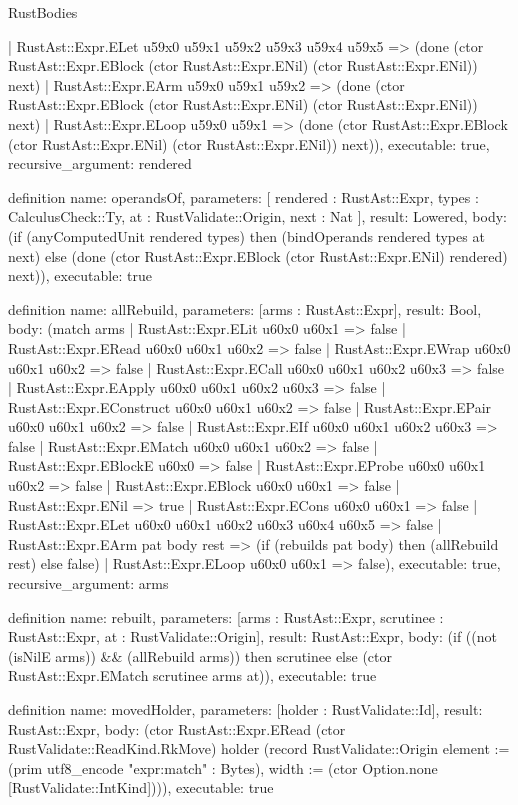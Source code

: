 \begin{lexlean}{RustBodies}
\begin{semanticmodule}
{    | RustAst::Expr.ELet u59x0 u59x1 u59x2 u59x3 u59x4 u59x5 => (done (ctor RustAst::Expr.EBlock (ctor RustAst::Expr.ENil) (ctor RustAst::Expr.ENil)) next)
    | RustAst::Expr.EArm u59x0 u59x1 u59x2 => (done (ctor RustAst::Expr.EBlock (ctor RustAst::Expr.ENil) (ctor RustAst::Expr.ENil)) next)
    | RustAst::Expr.ELoop u59x0 u59x1 => (done (ctor RustAst::Expr.EBlock (ctor RustAst::Expr.ENil) (ctor RustAst::Expr.ENil)) next)),
  executable: true,
  recursive_argument: rendered
}

definition{
  name: operandsOf,
  parameters: [
    rendered : RustAst::Expr,
    types : CalculusCheck::Ty,
    at : RustValidate::Origin,
    next : Nat
  ],
  result: Lowered,
  body: (if (anyComputedUnit rendered types) then (bindOperands rendered types at next) else (done (ctor RustAst::Expr.EBlock (ctor RustAst::Expr.ENil) rendered) next)),
  executable: true
}

definition{
  name: allRebuild,
  parameters: [arms : RustAst::Expr],
  result: Bool,
  body: (match arms
    | RustAst::Expr.ELit u60x0 u60x1 => false
    | RustAst::Expr.ERead u60x0 u60x1 u60x2 => false
    | RustAst::Expr.EWrap u60x0 u60x1 u60x2 => false
    | RustAst::Expr.ECall u60x0 u60x1 u60x2 u60x3 => false
    | RustAst::Expr.EApply u60x0 u60x1 u60x2 u60x3 => false
    | RustAst::Expr.EConstruct u60x0 u60x1 u60x2 => false
    | RustAst::Expr.EPair u60x0 u60x1 u60x2 => false
    | RustAst::Expr.EIf u60x0 u60x1 u60x2 u60x3 => false
    | RustAst::Expr.EMatch u60x0 u60x1 u60x2 => false
    | RustAst::Expr.EBlockE u60x0 => false
    | RustAst::Expr.EProbe u60x0 u60x1 u60x2 => false
    | RustAst::Expr.EBlock u60x0 u60x1 => false
    | RustAst::Expr.ENil => true
    | RustAst::Expr.ECons u60x0 u60x1 => false
    | RustAst::Expr.ELet u60x0 u60x1 u60x2 u60x3 u60x4 u60x5 => false
    | RustAst::Expr.EArm pat body rest => (if (rebuilds pat body) then (allRebuild rest) else false)
    | RustAst::Expr.ELoop u60x0 u60x1 => false),
  executable: true,
  recursive_argument: arms
}

definition{
  name: rebuilt,
  parameters: [arms : RustAst::Expr, scrutinee : RustAst::Expr, at : RustValidate::Origin],
  result: RustAst::Expr,
  body: (if ((not (isNilE arms)) && (allRebuild arms)) then scrutinee else (ctor RustAst::Expr.EMatch scrutinee arms at)),
  executable: true
}

definition{
  name: movedHolder,
  parameters: [holder : RustValidate::Id],
  result: RustAst::Expr,
  body: (ctor RustAst::Expr.ERead (ctor RustValidate::ReadKind.RkMove) holder (record RustValidate::Origin {element := (prim utf8_encode "expr:match" : Bytes), width := (ctor Option.none [RustValidate::IntKind])})),
  executable: true
}


\end{semanticmodule}
\end{lexlean}

